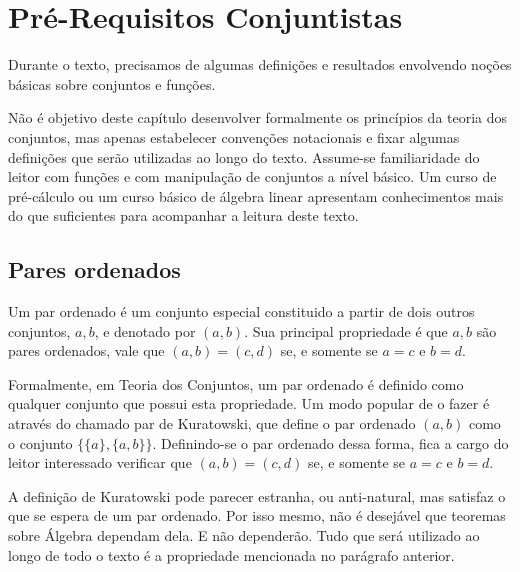 
\chapter{Pré-Requisitos Conjuntistas}
Durante o texto, precisamos de algumas definições e resultados envolvendo noções básicas sobre conjuntos e funções.

Não é objetivo deste capítulo desenvolver formalmente os princípios da teoria dos conjuntos, mas apenas estabelecer convenções notacionais e fixar algumas definições que serão utilizadas ao longo do texto. Assume-se familiaridade do leitor com funções e com manipulação de conjuntos a nível básico.
Um curso de pré-cálculo ou um curso básico de álgebra linear apresentam conhecimentos mais do que suficientes para acompanhar a leitura deste texto.

\section{Pares ordenados}
Um par ordenado é um conjunto especial constituido a partir de dois outros conjuntos, $a, b$, e denotado por $(a, b)$.
Sua principal propriedade é que $a, b$ são pares ordenados, vale que $(a, b)=(c, d)$ se, e somente se $a=c$ e $b=d$.

Formalmente, em Teoria dos Conjuntos, um par ordenado é definido como qualquer conjunto que possui esta propriedade.
Um modo popular de o fazer é através do chamado par de Kuratowski, que define o par ordenado $(a, b)$ como o conjunto $\{\{a\}, \{a, b\}\}$.
Definindo-se o par ordenado dessa forma, fica a cargo do leitor interessado verificar que $(a, b)=(c, d)$ se, e somente se $a=c$ e $b=d$.

A definição de Kuratowski pode parecer estranha, ou anti-natural, mas satisfaz o que se espera de um par ordenado.
Por isso mesmo, não é desejável que teoremas sobre Álgebra dependam dela. E não dependerão. Tudo que será utilizado ao longo de todo o texto é a propriedade mencionada no parágrafo anterior.

